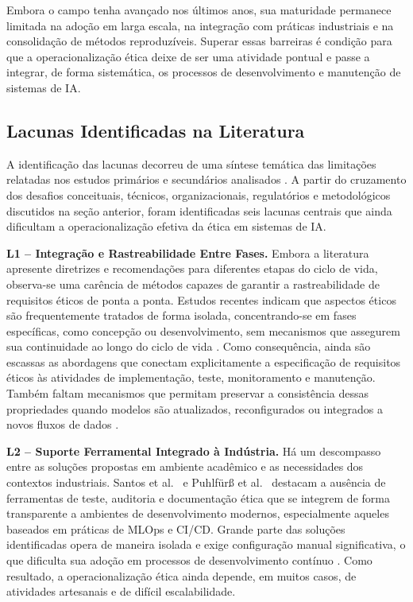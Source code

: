 Embora o campo tenha avançado nos últimos anos, sua maturidade permanece limitada na adoção em larga escala, na integração com práticas industriais e na consolidação de métodos reproduzíveis. Superar essas barreiras é condição para que a operacionalização ética deixe de ser uma atividade pontual e passe a integrar, de forma sistemática, os processos de desenvolvimento e manutenção de sistemas de IA.

\subsection{Lacunas Identificadas na Literatura}

A identificação das lacunas decorreu de uma síntese temática das limitações relatadas nos estudos primários e secundários analisados \cite{S053, S058}. A partir do cruzamento dos desafios conceituais, técnicos, organizacionais, regulatórios e metodológicos discutidos na seção anterior, foram identificadas seis lacunas centrais que ainda dificultam a operacionalização efetiva da ética em sistemas de IA.

\textbf{L1 -- Integração e Rastreabilidade Entre Fases.} Embora a literatura apresente diretrizes e recomendações para diferentes etapas do ciclo de vida, observa-se uma carência de métodos capazes de garantir a rastreabilidade de requisitos éticos de ponta a ponta. Estudos recentes indicam que aspectos éticos são frequentemente tratados de forma isolada, concentrando-se em fases específicas, como concepção ou desenvolvimento, sem mecanismos que assegurem sua continuidade ao longo do ciclo de vida \cite{S038, S053}. Como consequência, ainda são escassas as abordagens que conectam explicitamente a especificação de requisitos éticos às atividades de implementação, teste, monitoramento e manutenção. Também faltam mecanismos que permitam preservar a consistência dessas propriedades quando modelos são atualizados, reconfigurados ou integrados a novos fluxos de dados \cite{S058}.

\textbf{L2 -- Suporte Ferramental Integrado à Indústria.} Há um descompasso entre as soluções propostas em ambiente acadêmico e as necessidades dos contextos industriais. Santos et al.~\cite{S022} e Puhlfürß et al.~\cite{S023} destacam a ausência de ferramentas de teste, auditoria e documentação ética que se integrem de forma transparente a ambientes de desenvolvimento modernos, especialmente aqueles baseados em práticas de MLOps e CI/CD. Grande parte das soluções identificadas opera de maneira isolada e exige configuração manual significativa, o que dificulta sua adoção em processos de desenvolvimento contínuo \cite{S022, S030}. Como resultado, a operacionalização ética ainda depende, em muitos casos, de atividades artesanais e de difícil escalabilidade.


